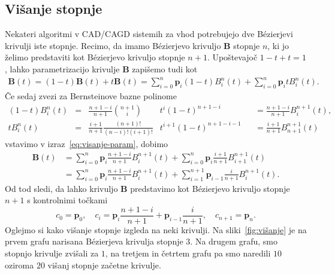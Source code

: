\documentclass[isrm2, tisk]{fmfdelo}
\newcommand{\p}{\mathbf{p}}
\newcommand{\B}{\mathbf{B}}
\begin{document}
    \subsection{Višanje stopnje}
    Nekateri algoritmi v CAD/CAGD sistemih za vhod potrebujejo dve Bézierjevi krivulji iste stopnje.
    Recimo, da imamo Bézierjevo krivuljo $\B$ stopnje $n$, ki jo želimo predstaviti kot Bézierjevo krivuljo stopnje $n+1$.
    Upoštevajoč $1-t+t=1$, lahko parametrizacijo krivulje $\B$ zapišemo tudi kot
    \begin{align}
        \B(t) = (1-t)\B(t)+t\B(t) = \sum_{i=0}^{n}\mathbf{p}_{i}(1-t)B_i^n(t) +\sum_{i=0}^{n}\mathbf{p}_{i}tB_i^n(t). \label{eq:visanje-param}
    \end{align}
    Če sedaj zvezi za Bernsteinove bazne polinome
    \begin{align*}
    (1-t)
        B_i^n(t) &= & \frac{n+1-i}{n+1} \binom{n+1}{i}&t^i(1-t)^{n+1-i} & &=\frac{n+1-i}{n+1}B_{i}^{n+1}(t), \\
        tB_i^n(t) &= & \frac{i+1}{n+1}\frac{(n+1)!}{(n-i)!(i+1)!}&t^{i+1}(1-t)^{n+1-i-1} & &= \frac{i+1}{n+1}B_{n+1}^{n+1}(t)
    \end{align*}
    vstavimo v izraz~\ref{eq:visanje-param}, dobimo
    \begin{align*}
        \B(t) &= \sum_{i=0}^{n}\mathbf{p}_{i}\frac{n+1-i}{n+1}B_{i}^{n+1}(t) +\sum_{i=0}^{n}\mathbf{p}_{i}\frac{i+1}{n+1}B_{i+1}^{n+1}(t)\\
        &= \sum_{i=0}^{n}\mathbf{p}_{i}\frac{n+1-i}{n+1}B_{i}^{n+1}(t) +\sum_{i=1}^{n+1}\mathbf{p}_{i-1}\frac{i}{n+1}B_{i}^{n+1}(t).
    \end{align*}
    Od tod sledi, da lahko krivuljo $\B$ predstavimo kot Bézierjevo krivuljo stopnje $n+1$ s kontrolnimi točkami \[c_0=\p_0, \quad c_i=\mathbf{p}_{i}\frac{n+1-i}{n+1} + \mathbf{p}_{i-1}\frac{i}{n+1},\quad c_{n+1}=\p_n. \]
    Oglejmo si kako višanje stopnje izgleda na neki krivulji.
    Na sliki~\ref{fig:višanje} je na prvem grafu narisana Bézierjeva krivulja stopnje $3$.
    Na drugem grafu, smo stopnjo krivulje zvišali za $1$, na tretjem in četrtem grafu pa smo naredili $10$ oziroma $20$ višanj stopnje začetne krivulje.
\end{document}
